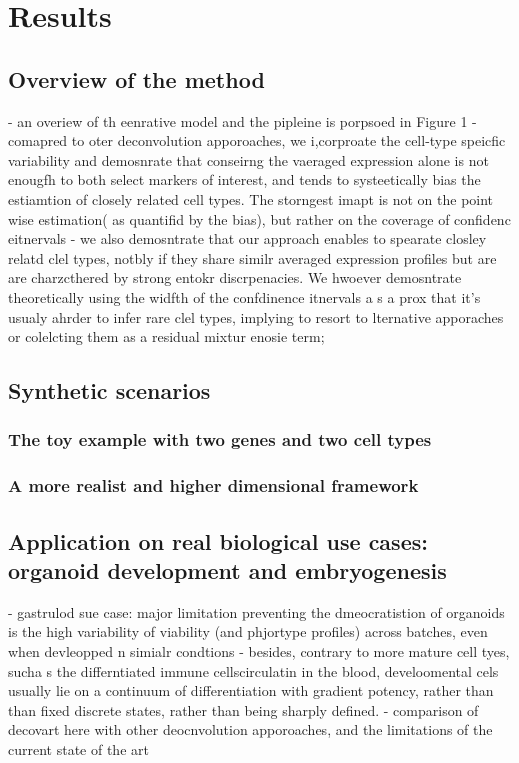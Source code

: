 \documentclass[pdflatex, sn-nature]{sn-jnl}
\theoremstyle{thmstyleone}%
\theoremstyle{thmstyletwo}%
\theoremstyle{thmstylethree}%
\begin{document}
    \section{Results}
    \subsection{Overview of the method}
    - an overiew of th eenrative model and the pipleine is porpsoed in Figure 1
    - comapred to oter deconvolution apporoaches, we i,corproate the cell-type speicfic variability and demosnrate that conseirng
    the vaeraged expression alone is not enougfh to both select markers of interest, and 
    tends to systeetically bias the estiamtion of closely related cell types. The storngest imapt is not
    on the point wise estimation( as quantifid by the bias), but rather  on the coverage of confidenc eitnervals
    - we also demosntrate that our approach enables to spearate closley relatd clel types, notbly
    if they share similr averaged expression profiles but are are charzcthered by strong entokr discrpenacies. We hwoever
    demosntrate theoretically using the widfth of the confdinence itnervals a s a prox that it's usualy ahrder to infer rare clel types, 
    implying to resort to lternative apporaches or colelcting them as a residual mixtur enosie term; 
   
    \subsection{Synthetic scenarios}

    \subsubsection{The toy example with two genes and two cell types}

    \subsubsection{A more realist and higher dimensional framework}

    \subsection{Application on real biological use cases: organoid development and embryogenesis}
    
     - gastrulod sue case: major limitation preventing the dmeocratistion of organoids is the high variability
     of viability (and phjortype profiles) across batches, even when devleopped n simialr condtions
     - besides, contrary to more mature cell tyes, sucha s the differntiated immune cellscirculatin in the blood, 
     develoomental cels usually lie on a continuum of differentiation with gradient potency, rather than than fixed discrete states, rather than being sharply defined.
     - comparison of decovart here with other deocnvolution apporoaches, and the limitations of the current state of the art
\end{document}
